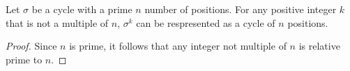 \documentclass[12pt]{article}
\newenvironment{corollary}[2][Corollary]{\begin{trivlist} \item[\hskip \labelsep {\bfseries #1}\hskip \labelsep {\bfseries #2.}]}{\end{trivlist}}
\begin{document}
\begin{corollary}{a1}
  Let $\sigma$ be a cycle with a prime $n$ number of positions. For any positive integer $k$ that is not a multiple of $n$, $\sigma^{k}$ can be respresented as a cycle of $n$ positions.
\begin{proof}
  Since $n$ is prime, it follows that any integer not multiple of $n$ is relative prime to $n$.                                            
\end{proof}
\end{corollary}
       
\end{document}
